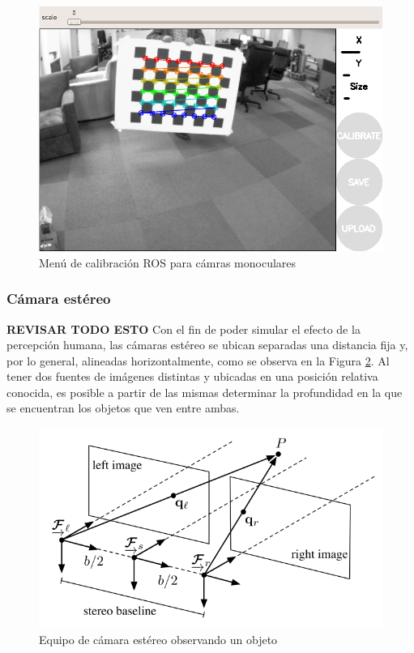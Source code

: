 \begin{figure}
    \centering
    \includegraphics[width=\textwidth]{Img/MonocularCameraCalibration.png}
    \caption{Menú de calibración ROS para cámras monoculares}
    \label{fig:monocularcameracalibration}
\end{figure}



\subsubsection{Cámara estéreo}
\textbf{REVISAR TODO ESTO}
Con el fin de poder simular el efecto de la percepción humana, las cámaras estéreo se ubican separadas una distancia fija y, por lo general, alineadas horizontalmente, como se observa en la Figura \ref{fig:stereocamerarig}. Al tener dos fuentes de imágenes distintas y ubicadas en una posición relativa conocida, es posible a partir de las mismas determinar la profundidad en la que se encuentran los objetos que ven entre ambas. 
\begin{figure}[!ht]
    \centering
    \includegraphics[width=\textwidth]{Img/StereoCameraRig.png}
    \caption{Equipo de cámara estéreo observando un objeto}
    \label{fig:stereocamerarig}
\end{figure}

